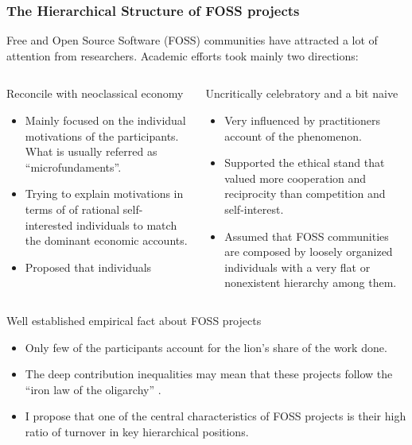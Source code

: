 \documentclass[ignorenonframetext,red,8pt,notes=hide]{beamer}
\begin{document}
\begin{frame}
\frametitle{The Hierarchical Structure of FOSS projects}

Free and Open Source Software (FOSS) communities have attracted a lot of attention from researchers. Academic efforts took mainly two directions:

\begin{columns}[c]
\begin{column}{0.5\textwidth}
\begin{block}{Reconcile with neoclassical economy}
\begin{itemize}
\item Mainly focused on the individual motivations of the participants. What is usually referred as ``microfundaments''.
\item Trying to explain motivations in terms of of rational self-interested individuals to match the dominant economic accounts.
\item Proposed that individuals 
\end{itemize}
\end{block}
\end{column}

\pause

\begin{column}{0.5\textwidth}

\begin{block}{Uncritically celebratory and a bit naive}
\begin{itemize}
\item Very influenced by practitioners account of the phenomenon.
\item Supported the ethical stand that valued more cooperation and reciprocity than competition and self-interest.
\item Assumed that FOSS communities are composed by loosely organized individuals with a very flat or nonexistent hierarchy among them.
\end{itemize}
\end{block}
\end{column}
\end{columns}

\pause


\begin{block}{Well established empirical fact about FOSS projects}
\begin{itemize}
\item Only few of the participants account for the lion's share of the work done.
\item The deep contribution inequalities may mean that these projects follow the ``iron law of the oligarchy'' \citep{shaw:2014}.
\item I propose that one of the central characteristics of FOSS projects is their high ratio of turnover in key hierarchical positions.
\end{itemize}
\end{block}

\end{frame}
\end{document}
